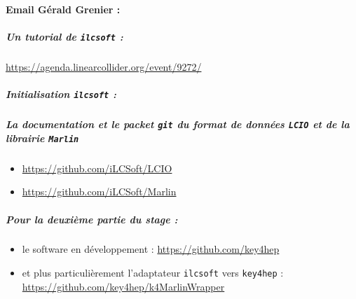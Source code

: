 \paragraph{Email Gérald Grenier :}

\subparagraph{Un tutorial de \texttt{ilcsoft} :} 
\url{https://agenda.linearcollider.org/event/9272/}

\subparagraph{Initialisation \texttt{ilcsoft} :}

\subparagraph{La documentation et le packet \texttt{git} du format de données \texttt{LCIO} et de la librairie \texttt{Marlin}}
\begin{itemize}
	\item \url{https://github.com/iLCSoft/LCIO} \cite{Gaede:2003ip}
	\item \url{https://github.com/iLCSoft/Marlin}
\end{itemize}


\subparagraph{Pour la deuxième partie du stage :}
\begin{itemize}

	\item le software en développement : 
			\url{https://github.com/key4hep}
			
	\item et plus particulièrement l'adaptateur \texttt{ilcsoft} vers \texttt{key4hep} : 
			\url{https://github.com/key4hep/k4MarlinWrapper}
			
\end{itemize}  
